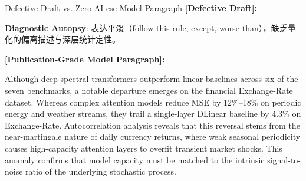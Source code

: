 \begin{ExampleBox}{Defective Draft vs. Zero AI-ese Model Paragraph}
\textbf{\color{TargetHighlight}[Defective Draft]:}\par
{}\par\vspace{4pt}
\textbf{Diagnostic Autopsy}: 表达平淡（follow this rule, except, worse than），缺乏量化的偏离描述与深层统计定性。\par\vspace{6pt}
\textbf{\color{AcadNavy}[Publication-Grade Model Paragraph]:}\par
Although deep spectral transformers outperform linear baselines across six of the seven benchmarks, a notable departure emerges on the financial Exchange-Rate dataset. Whereas complex attention models reduce MSE by 12\%--18\% on periodic energy and weather streams, they trail a single-layer DLinear baseline by 4.3\% on Exchange-Rate. Autocorrelation analysis reveals that this reversal stems from the near-martingale nature of daily currency returns, where weak seasonal periodicity causes high-capacity attention layers to overfit transient market shocks. This anomaly confirms that model capacity must be matched to the intrinsic signal-to-noise ratio of the underlying stochastic process.
\end{ExampleBox}
